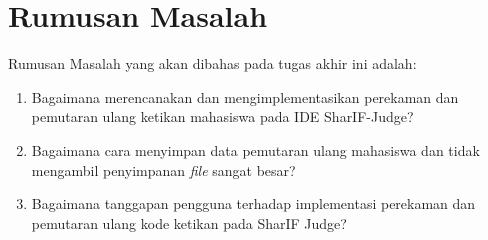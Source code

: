 \begin{comment}
Tugas akhir ini merupakan sebuah pengembangan lanjutan dari tugas akhir yang bertopik ``Implementasi editor kode pada Sharif Judge''~\cite{nicholas:sharif} oleh Nicholas Aditya Halim. Tugas akhir tersebut menceritakan bahwa SharIF-Judge tidak memiliki kemampuan untuk mengawasi proses pembuatan kode program karena para mahasiswa menggunakan aplikasi eksternal untuk pembuatan kode program tersebut. Sehingga dibuatnya modifikasi terhadap SharIF-Judge untuk menambahkan \textit{Intergrated Development Enviroment} (IDE), sebuah aplikasi untuk mengedit, mengompilasi, dan menjalankan kode program pada SharIF-Judge dengan editor kode bernama Ace~\cite{ace}. Gambar~\ref{fig:1:editor-kode} merupakan tampilan editor kode yang sudah diimplementasikan pada SharIF-Judge.

\begin{figure}
    \centering
    \texttt{[image: kode-editor]}
    \caption[Tampilan editor kode pada SharIF-Judge]{Tampilan editor kode pada SharIF-Judge}
    \label{fig:1:editor-kode}
\end{figure}

Tetapi SharIF Judge masih tidak memiliki kemampuan untuk mengawasi proses pembuatan kode program pada aplikasi eksternal maupun IDE dalam SharIF Judge. Maka dari itu tugas akhir ini menambahkan fitur pada SharIF Judge dengan merekam ketikan pada IDE yang tersedia di SharIF-Judge untuk membantu pengawasan dengan merekam dan memutar ulang ketikan mahasiswa. Tugas akhir ini akan membuat pengawasan terhadap kegiatan kuliah lebih mudah untuk pengawas dan dapat menjadi bukti kecurangan jika dibutuhkan.
\end{comment}

\section{Rumusan Masalah}
\label{sec:1:rumusan}

Rumusan Masalah yang akan dibahas pada tugas akhir ini adalah:
\begin{enumerate}
    \item Bagaimana merencanakan dan mengimplementasikan perekaman dan pemutaran ulang ketikan mahasiswa pada IDE SharIF-Judge?
    \item Bagaimana cara menyimpan data pemutaran ulang mahasiswa dan tidak mengambil penyimpanan \textit{file} sangat besar?
    \item Bagaimana tanggapan pengguna terhadap implementasi perekaman dan pemutaran ulang kode ketikan pada SharIF Judge?
\end{enumerate}

